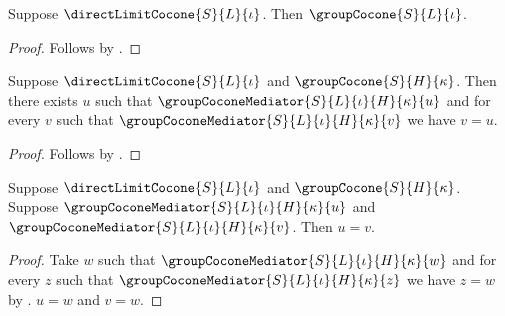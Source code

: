 \begin{proposition}\label{direct_limit_cocone_is_cocone}
    Suppose $\directLimitCocone{S}{L}{\iota}$.
    Then $\groupCocone{S}{L}{\iota}$.
\end{proposition}
\begin{proof}
    Follows by .
\end{proof}

\begin{theorem}\label{direct_limit_cocone_universal}
    Suppose $\directLimitCocone{S}{L}{\iota}$ and
        $\groupCocone{S}{H}{\kappa}$.
    Then there exists $u$ such that
        $\groupCoconeMediator{S}{L}{\iota}{H}{\kappa}{u}$ and
        for every $v$ such that
            $\groupCoconeMediator{S}{L}{\iota}{H}{\kappa}{v}$
        we have $v=u$.
\end{theorem}
\begin{proof}
    Follows by .
\end{proof}

\begin{proposition}\label{direct_limit_cocone_mediator_unique}
    Suppose $\directLimitCocone{S}{L}{\iota}$ and
        $\groupCocone{S}{H}{\kappa}$.
    Suppose $\groupCoconeMediator{S}{L}{\iota}{H}{\kappa}{u}$ and
        $\groupCoconeMediator{S}{L}{\iota}{H}{\kappa}{v}$.
    Then $u=v$.
\end{proposition}
\begin{proof}
    Take $w$ such that
        $\groupCoconeMediator{S}{L}{\iota}{H}{\kappa}{w}$ and
        for every $z$ such that
            $\groupCoconeMediator{S}{L}{\iota}{H}{\kappa}{z}$
        we have $z=w$ by
        .
    $u=w$ and $v=w$.
\end{proof}
